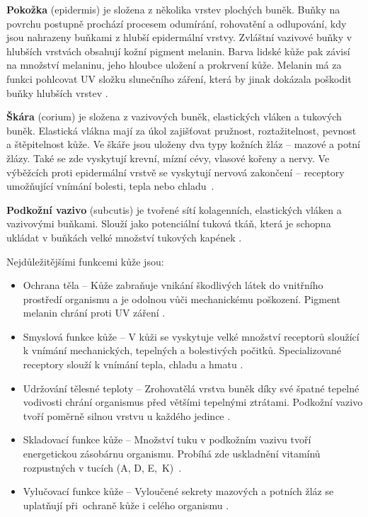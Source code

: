 \textbf{Pokožka} (epidermis) je složena z několika vrstev plochých buněk. Buňky na povrchu postupně prochází procesem odumírání, rohovatění a odlupování, kdy jsou nahrazeny buňkami z hlubší epidermální vrstvy. Zvláštní vazivové buňky v hlubších vrstvách obsahují kožní pigment melanin. Barva lidské kůže pak závisí na množství melaninu, jeho hloubce uložení a prokrvení kůže. Melanin má za funkci pohlcovat UV složku slunečního záření, která by jinak dokázala poškodit buňky hlubších vrstev \cite{ZakladyFunkcniAnatomieCloveka}.

\textbf{Škára} (corium) je složena z vazivových buněk, elastických vláken a tukových buněk. Elastická vlákna mají za úkol zajišťovat pružnost, roztažitelnost, pevnost a štěpitelnost kůže. Ve škáře jsou uloženy dva typy kožních žláz -- mazové a potní žlázy. Také se zde vyskytují krevní, mízní cévy, vlasové kořeny a nervy. Ve výběžcích proti epidermální vrstvě se vyskytují nervová zakončení -- receptory umožňující vnímání bolesti, tepla nebo chladu~\cite{ZakladyFunkcniAnatomieCloveka}.

\textbf{Podkožní vazivo} (subcutis) je tvořené sítí kolagenních, elastických vláken a vazivovými buňkami. Slouží jako potenciální tuková tkáň, která je schopna ukládat v buňkách velké množství tukových kapének \cite{ZakladyFunkcniAnatomieCloveka}.

Nejdůležitějšími funkcemi kůže jsou:
\begin{itemize}
    \item Ochrana těla -- Kůže zabraňuje vnikání škodlivých látek do vnitřního prostředí organismu a je odolnou vůči mechanickému poškození. Pigment melanin chrání proti UV záření \cite{ZakladyFunkcniAnatomieCloveka}.
    \item Smyslová funkce kůže -- V kůži se vyskytuje velké množství receptorů sloužící k vnímání mechanických, tepelných a bolestivých počitků. Specializované receptory slouží k vnímání tepla, chladu a hmatu \cite{ZakladyFunkcniAnatomieCloveka}.
    \item Udržování tělesné teploty -- Zrohovatělá vrstva buněk díky své špatné tepelné vodivosti chrání organismus před většími tepelnými ztrátami. Podkožní vazivo tvoří poměrně silnou vrstvu u každého jedince \cite{ZakladyFunkcniAnatomieCloveka}.
     \item Skladovací funkce kůže -- Množství tuku v podkožním vazivu tvoří energetickou zásobárnu organismu. Probíhá zde uskladnění vitamínů rozpustných v tucích (A, D, E,~K)~\cite{ZakladyFunkcniAnatomieCloveka}.
    \item Vylučovací funkce kůže -- Vyloučené sekrety mazových a potních žláz se uplatňují při~ochraně kůže i celého organismu \cite{ZakladyFunkcniAnatomieCloveka}.
\end{itemize}

